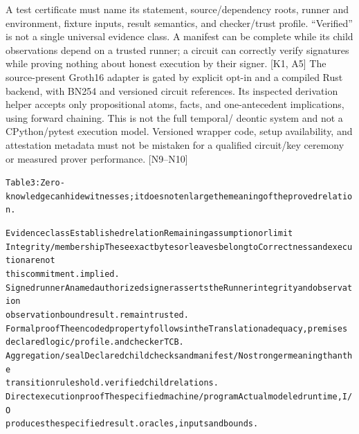 A test certificate must name its statement, source/dependency roots, runner and environment, fixture
inputs, result semantics, and checker/trust profile. “Verified” is not a single universal evidence class.
A manifest can be complete while its child observations depend on a trusted runner; a circuit can
correctly verify signatures while proving nothing about honest execution by their signer. [K1, A5]
The source-present Groth16 adapter is gated by explicit opt-in and a compiled Rust backend, with
BN254 and versioned circuit references. Its inspected derivation helper accepts only propositional
atoms, facts, and one-antecedent implications, using forward chaining. This is not the full temporal/
deontic system and not a CPython/pytest execution model. Versioned wrapper code, setup availability,
and attestation metadata must not be mistaken for a qualified circuit/key ceremony or measured
prover performance. [N9–N10]


\begingroup\fontsize{7}{8.4}\selectfont
\begin{alltt}
Table 3: Zero-knowledge can hide witnesses; it does not enlarge the meaning of the proved relation.
\end{alltt}\endgroup

\begingroup\fontsize{7}{8.4}\selectfont
\begin{alltt}
Evidence class            Established relation                       Remaining assumption or limit
Integrity / membership    These exact bytes or leaves belong to      Correctness and execution are not
                          this commitment.                           implied.
Signed runner             A named authorized signer asserts the      Runner integrity and observation
observation               bound result.                              remain trusted.
Formal proof              The encoded property follows in the        Translation adequacy, premises
                          declared logic/profile.                    and checker TCB.
Aggregation / seal        Declared child checks and manifest/        No stronger meaning than the
                          transition rules hold.                     verified child relations.
Direct execution proof    The specified machine/program              Actual modeled runtime, I/O
                          produces the specified result.             oracles, inputs and bounds.
\end{alltt}\endgroup


